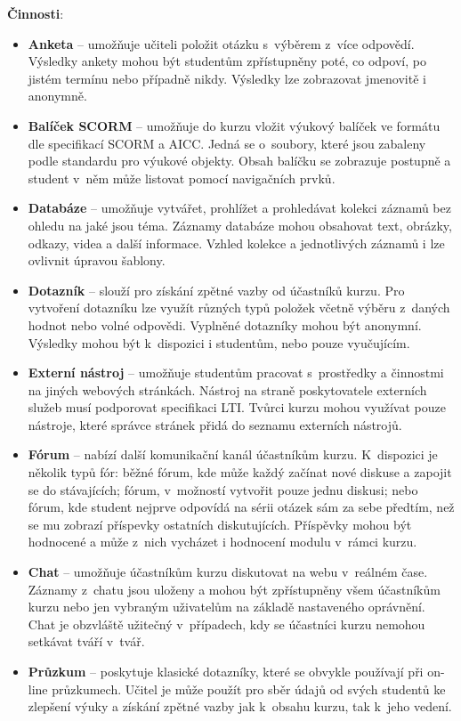 \documentclass[
print,
  11pt,
  table,   
  nolof,    
  nolot,
  oneside,final
]{fithesis3}
\begin{document}
\textbf{Činnosti}:
\begin{itemize}
\item \textbf{Anketa} -- umožňuje učiteli položit otázku s~výběrem z~více odpovědí. Výsledky ankety mohou být studentům zpřístupněny poté, co odpoví, po jistém termínu nebo případně nikdy. Výsledky lze zobrazovat jmenovitě i anonymně.
\item \textbf{Balíček SCORM} -- umožňuje do kurzu vložit výukový balíček ve formátu dle specifikací SCORM a AICC. Jedná se o~soubory, které jsou zabaleny podle standardu pro výukové objekty. Obsah balíčku se zobrazuje postupně a student v~něm může listovat pomocí navigačních prvků. 
\item \textbf{Databáze} -- umožňuje vytvářet, prohlížet a prohledávat kolekci záznamů bez ohledu na jaké jsou téma. Záznamy databáze mohou obsahovat text, obrázky, odkazy, videa a další informace. Vzhled kolekce a jednotlivých zázna\-mů i lze ovlivnit úpravou šablony.
\item \textbf{Dotazník} -- slouží pro získání zpětné vazby od účastníků kurzu. Pro vytvoření dotazníku lze využít různých typů položek včetně výběru z~daných hodnot nebo volné odpovědi. Vyplněné dotazníky mohou být anonymní. Výsledky mohou být k~dispozici i studentům, nebo pouze vyučujícím.
\item \textbf{Externí nástroj} -- umožňuje studentům pracovat s~prostředky a činnostmi na jiných webových stránkách. Nástroj na straně poskytovatele externích služeb musí podporovat specifikaci LTI. Tvůrci kurzu mohou využívat pouze nástroje, které správce stránek přidá do seznamu externích nástrojů.
\item \textbf{Fórum} -- nabízí další komunikační kanál účastníkům kurzu. K~dispozici je několik typů fór: běžné fórum, kde může každý začínat nové diskuse a zapojit se do stávajících; fórum, v~možností vytvořit pouze jednu diskusi; nebo fórum, kde student nejprve odpovídá na sérii otázek sám za sebe předtím, než se mu zobrazí příspevky ostatních diskutujících. Příspěvky mohou být hodnocené a může z~nich vycházet i hodnocení modulu v~rámci kurzu.
\item \textbf{Chat} -- umožňuje účastníkům kurzu diskutovat na webu v~reálném čase. Záznamy z~chatu jsou uloženy a mohou být zpřístupněny všem účastníkům kurzu nebo jen vybraným uživatelům na základě nastaveného oprávnění. Chat je obzvláště užitečný v~případech, kdy se účastníci kurzu nemohou setkávat tváří v~tvář.
\item \textbf{Průzkum} -- poskytuje klasické dotazníky, které se obvykle používají při on-line průzkumech. Učitel je může použít pro sběr údajů od svých studentů ke zlepšení výuky a získání zpětné vazby jak k~obsahu kurzu, tak k~jeho vedení.


\end{itemize}
\end{document}
